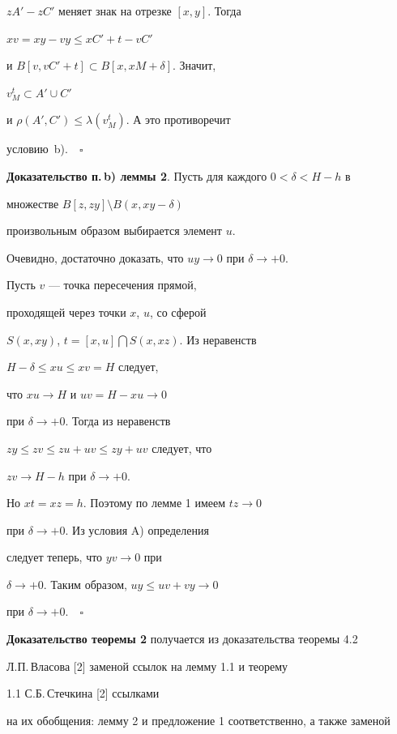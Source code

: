 $zA' - zC'$ меняет знак на отрезке $[x,y]$. Тогда


$xv = xy - vy \leq xC' + t - vC'$


и $B[v,vC' + t] \subset B[x,xM + \delta ]$. Значит,


$v_{M}^{t} \subset A'\cup C'$


и $\rho (A',C') \leq \lambda (v_{M}^{t})$. А это противоречит


условию~b).$\quad\square$


\medskip





{\bf Доказательство п.\,b) леммы 2}. Пусть для каждого $0<\delta<H-h$ в


множестве $B[z,zy]\setminus B(x,xy - \delta)$


произвольным образом выбирается элемент $u$.


Очевидно, достаточно доказать, что $uy \to 0$ при $\delta \to +0$.


Пусть $v$ --- точка пересечения прямой,


проходящей через точки $x$, $u$, со сферой


$S(x,xy)$, $t = [x,u]\bigcap S(x,xz)$. Из неравенств


$H - \delta \leq xu \leq xv = H$ следует,


что $xu \rightarrow H$ и $uv =H - xu \rightarrow 0$


при $\delta \to +0$. Тогда из неравенств


$zy \leq zv \leq zu + uv \leq zy + uv$ следует, что


$zv \rightarrow H - h$ при $\delta \to +0$.


Но $xt = xz = h$. Поэтому по лемме 1 имеем $tz \to 0$


при $\delta \to +0$. Из условия A) определения


следует теперь, что $yv \to 0$ при


$\delta \to +0$. Таким образом, $uy \leq uv +vy \to 0$


при $\delta \to +0$.$\quad\square$


\medskip





{\bf Доказательство теоремы 2} получается из доказательства теоремы 4.2 


Л.П.\,Власова [2] заменой ссылок на лемму 1.1 и теорему


1.1 С.Б.\,Стечкина [2] ссылками


на их обобщения: лемму 2 и предложение 1 соответственно, а также заменой 


